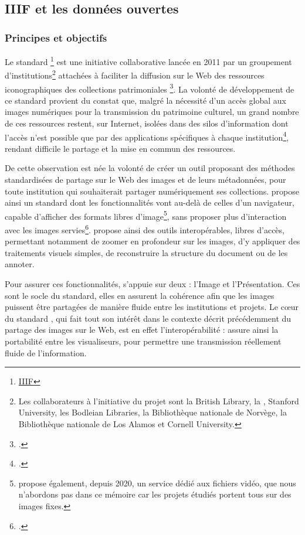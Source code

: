
\subsection{IIIF et les données ouvertes}
    \subsubsection{Principes et objectifs}
Le standard \iiif\footnote{\href{https://iiif.io/}{IIIF}} est une initiative collaborative lancée en 2011 par un groupement d'institutions\footnote{Les collaborateurs à l'initiative du projet sont la British Library, la \bnf, Stanford University, les Bodleian Libraries, la Bibliothèque nationale de Norvège, la Bibliothèque nationale de Los Alamos et Cornell University.} attachées à faciliter la diffusion sur le Web des ressources iconographiques des collections patrimoniales \footcite{cramerInternationalImageInteroperability2011}. La volonté de développement de ce standard provient du constat que, malgré la nécessité d'un accès global aux images numériques pour la transmission du patrimoine culturel, un grand nombre de ces ressources restent, sur Internet, isolées dans des silos d'information dont l'accès n'est possible que par des applications spécifiques à chaque institution\footcite{cramerInternationalImageInteroperability2011}, rendant difficile le partage et la mise en commun des ressources.

De cette observation est née la volonté de créer un outil proposant des méthodes standardisées de partage sur le Web des images et de leurs métadonnées, pour toute institution qui souhaiterait partager numériquement ses collections. \iiif propose ainsi un standard dont les fonctionnalités vont au-delà de celles d'un navigateur, capable d'afficher des formats libres d'image\footnote{\iiif propose également, depuis 2020, un service dédié aux fichiers vidéo, que nous n'abordons pas dans ce mémoire car les projets étudiés portent tous sur des images fixes.}, sans proposer plus d'interaction avec les images servies\footcite{HowItWorks}. \iiif propose ainsi des outils interopérables, libres d'accès, permettant notamment de zoomer en profondeur sur les images, d'y appliquer des traitements visuels simples, de reconstruire la structure du document ou de les annoter.

Pour assurer ces fonctionnalités, \iiif s'appuie sur deux \api : l'\api Image et l'\api Présentation. Ces \api sont le socle du standard, elles en assurent la cohérence afin que les images puissent être partagées de manière fluide entre les institutions et projets. Le cœur du standard \iiif, qui fait tout son intérêt dans le contexte décrit précédemment du partage des images sur le Web, est en effet l'interopérabilité : \iiif assure ainsi la portabilité entre les visualiseurs, pour permettre une transmission réellement fluide de l'information.
    
